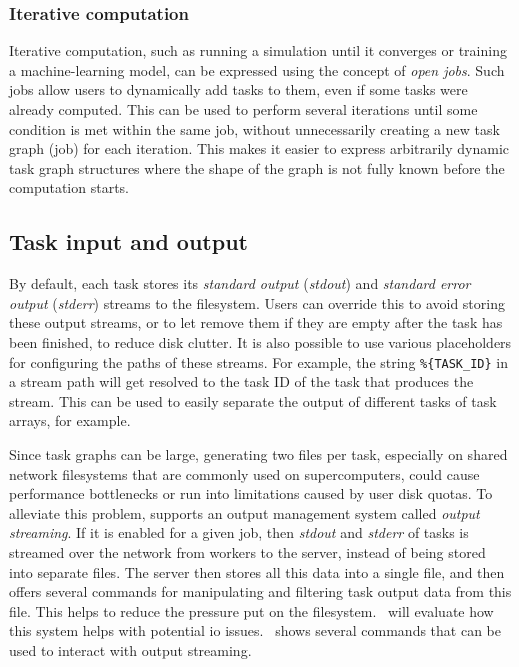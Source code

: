 \subsubsection*{Iterative computation}
Iterative computation, such as running a simulation until it converges or training a
machine-learning model, can be expressed using the concept of \emph{open jobs}. Such jobs
allow users to dynamically add tasks to them, even if some tasks were already computed. This can be
used to perform several iterations until some condition is met within the same job, without
unnecessarily creating a new task graph (job) for each iteration. This makes it easier to express
arbitrarily dynamic task graph structures where the shape of the graph is not fully known before
the computation starts.

\subsection{Task input and output}
\label{hq:task-input-and-output}
By default, each \hyperqueue{} task stores its \emph{standard output} (\emph{stdout}) and
\emph{standard error output} (\emph{stderr}) streams to the filesystem. Users can override this to avoid storing these
output streams, or to let \hq{} remove them if they are empty after the task has
been finished, to reduce disk clutter. It is also possible to use various placeholders for
configuring the paths of these streams. For example, the string \texttt{\%\{TASK\_ID\}} in a stream
path will get resolved to the task ID of the task that produces the stream. This can be used to
easily separate the output of different tasks of task arrays, for example.

Since task graphs can be large, generating two files per task, especially on shared network
filesystems that are commonly used on supercomputers, could cause performance bottlenecks or run
into limitations caused by user disk quotas. To alleviate this problem, \hq{}
supports an output management system called \emph{output streaming}. If it is enabled for a given
job, then \emph{stdout} and \emph{stderr} of tasks is streamed over the network
from workers to the server, instead of being stored into separate files. The server then stores all
this data into a single file, and then offers several commands for manipulating and filtering task
output data from this file. This helps to reduce the pressure put on the
filesystem.~ will evaluate how this system helps with potential
\gls{io} issues.~ shows several \hq{}
commands that can be used to interact with output streaming.

